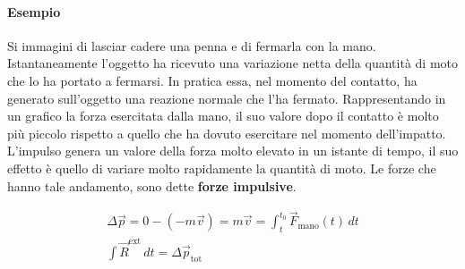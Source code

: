 \begin{figure}[htpb]
\end{figure}
\FloatBarrier

\paragraph{Esempio} Si immagini di lasciar cadere una penna e di fermarla con la mano. Istantaneamente l'oggetto ha ricevuto una variazione netta della quantità di moto che lo ha portato a fermarsi. In pratica essa, nel momento del contatto, ha generato sull'oggetto una reazione normale che l'ha fermato. Rappresentando in un grafico la forza esercitata dalla mano, il suo valore dopo il contatto è molto più piccolo rispetto a quello che ha dovuto esercitare nel momento dell'impatto. L'impulso genera un valore della forza molto elevato in un istante di tempo, il suo effetto è quello di variare molto rapidamente la quantità di moto. Le forze che hanno tale andamento, sono dette \textbf{forze impulsive}.

\begin{gather*}
	\Delta \vec{p}=0-(-m\vec{v})=m\vec{v}=\int_t^{t_0} \vec{F}_\text{mano} (t)\,dt \\
	\int\vec{R}^\text{ext} \,dt=\Delta \vec{p}_\text{tot}
\end{gather*}

